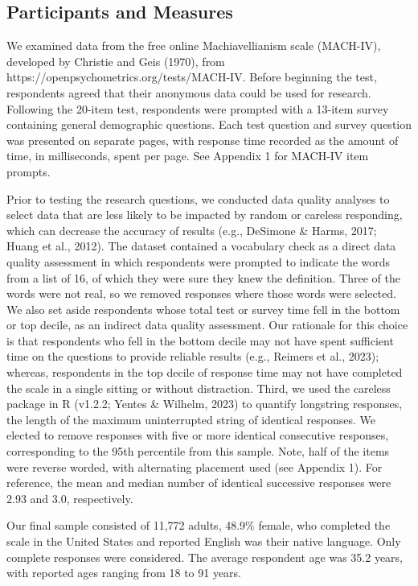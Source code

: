 \documentclass[
  number]{elsarticle}
\begin{document}
\subsection{Participants and Measures}\label{participants-and-measures}

We examined data from the free online Machiavellianism scale (MACH-IV),
developed by Christie and Geis (1970), from
https://openpsychometrics.org/tests/MACH-IV. Before beginning the test,
respondents agreed that their anonymous data could be used for research.
Following the 20-item test, respondents were prompted with a 13-item
survey containing general demographic questions. Each test question and
survey question was presented on separate pages, with response time
recorded as the amount of time, in milliseconds, spent per page. See
Appendix 1 for MACH-IV item prompts.

Prior to testing the research questions, we conducted data quality
analyses to select data that are less likely to be impacted by random or
careless responding, which can decrease the accuracy of results (e.g.,
DeSimone \& Harms, 2017; Huang et al., 2012). The dataset contained a
vocabulary check as a direct data quality assessment in which
respondents were prompted to indicate the words from a list of 16, of
which they were sure they knew the definition. Three of the words were
not real, so we removed responses where those words were selected. We
also set aside respondents whose total test or survey time fell in the
bottom or top decile, as an indirect data quality assessment. Our
rationale for this choice is that respondents who fell in the bottom
decile may not have spent sufficient time on the questions to provide
reliable results (e.g., Reimers et al., 2023); whereas, respondents in
the top decile of response time may not have completed the scale in a
single sitting or without distraction. Third, we used the careless
package in R (v1.2.2; Yentes \& Wilhelm, 2023) to quantify longstring
responses, the length of the maximum uninterrupted string of identical
responses. We elected to remove responses with five or more identical
consecutive responses, corresponding to the 95th percentile from this
sample. Note, half of the items were reverse worded, with alternating
placement used (see Appendix 1). For reference, the mean and median
number of identical successive responses were 2.93 and 3.0,
respectively.

Our final sample consisted of 11,772 adults, 48.9\% female, who
completed the scale in the United States and reported English was their
native language. Only complete responses were considered. The average
respondent age was 35.2 years, with reported ages ranging from 18 to 91
years.
\end{document}
